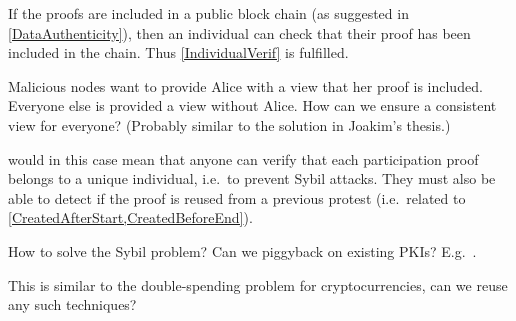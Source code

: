 If the proofs are included in a public block chain (as suggested in 
\cref{DataAuthenticity}), then an individual can check that their proof has 
been included in the chain.
Thus \cref{IndividualVerif} is fulfilled.

\begin{frame}

  \pause

  \begin{question}
    Malicious nodes want to provide Alice with a view that her proof is 
    included.
    Everyone else is provided a view without Alice.
    How can we ensure a consistent view for everyone?
    (Probably similar to the solution in Joakim's thesis.)
  \end{question}
\end{frame}

 would in this case mean that anyone can verify that 
each participation proof belongs to a unique individual, i.e.\ to prevent Sybil 
attacks.
They must also be able to detect if the proof is reused from a previous protest 
(i.e.\ related to \cref{CreatedAfterStart,CreatedBeforeEnd}).

\begin{frame}

  \pause

  \begin{question}
    How to solve the Sybil problem?
    Can we piggyback on existing \acp{PKI}?
    E.g.~\cite{Cinderella}.
  \end{question}
  \begin{question}
    This is similar to the double-spending problem for cryptocurrencies, can 
    we reuse any such techniques?
  \end{question}
\end{frame}

